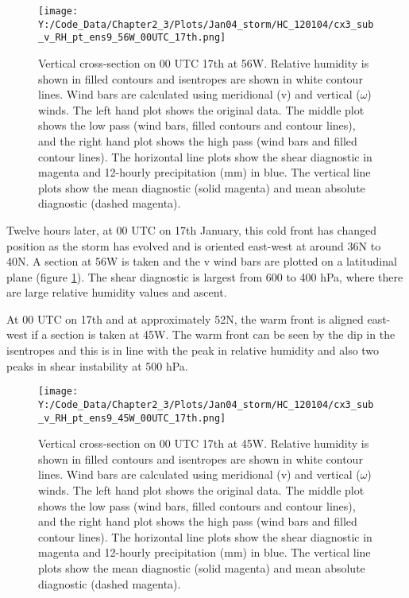 %
%
\begin{figure}[h]	
	\texttt{[image: Y:/Code\_Data/Chapter2\_3/Plots/Jan04\_storm/HC\_120104/cx3\_sub\_v\_RH\_pt\_ens9\_56W\_00UTC\_17th.png]}
	\caption{Vertical cross-section on 00 UTC 17th at 56W. Relative humidity is shown in filled contours and isentropes are shown in white contour lines. Wind bars are calculated using meridional (v) and vertical ($\omega$) winds. The left hand plot shows the original data. The middle plot shows the low pass (wind bars, filled contours and contour lines), and the right hand plot shows the high pass (wind bars and filled contour lines). The horizontal line plots show the shear diagnostic in magenta and 12-hourly precipitation (mm) in blue. The vertical line plots show the mean diagnostic (solid magenta) and mean absolute diagnostic (dashed magenta).}\label{fig:HC_cxC}
	\centering
\end{figure}

Twelve hours later, at 00 UTC on 17th January, this cold front has changed position as the storm has evolved and is oriented east-west at around 36N to 40N. A section at 56W is taken and the v wind bars are plotted on a latitudinal plane (figure \ref{fig:HC_cxC}). The shear diagnostic is largest from 600 to 400 hPa, where there are large relative humidity values and ascent.



At 00 UTC on 17th and at approximately 52N, the warm front is aligned east-west if a section is taken at 45W. The warm front can be seen by the dip in the isentropes and this is in line with the peak in relative humidity and also two peaks in shear instability at 500 hPa.

\begin{figure}[h]	
	\texttt{[image: Y:/Code\_Data/Chapter2\_3/Plots/Jan04\_storm/HC\_120104/cx3\_sub\_v\_RH\_pt\_ens9\_45W\_00UTC\_17th.png]}
	\caption{Vertical cross-section on 00 UTC 17th at 45W. Relative humidity is shown in filled contours and isentropes are shown in white contour lines. Wind bars are calculated using meridional (v) and vertical ($\omega$) winds. The left hand plot shows the original data. The middle plot shows the low pass (wind bars, filled contours and contour lines), and the right hand plot shows the high pass (wind bars and filled contour lines). The horizontal line plots show the shear diagnostic in magenta and 12-hourly precipitation (mm) in blue. The vertical line plots show the mean diagnostic (solid magenta) and mean absolute diagnostic (dashed magenta).}\label{fig:HC_cxE}
	\centering
\end{figure}

